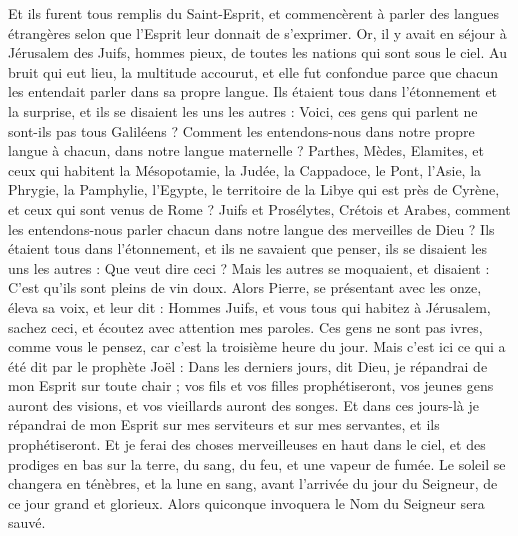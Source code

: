 \begin{multicols}{2}
Et ils furent tous remplis du Saint-Esprit, et commencèrent à parler des langues étrangères selon que l'Esprit leur donnait de s’exprimer.
Or, il y avait en séjour à Jérusalem des Juifs, hommes pieux, de toutes les nations qui sont sous le ciel.
Au bruit qui eut lieu, la multitude accourut, et elle fut confondue parce que chacun les entendait parler dans sa propre langue.
Ils étaient tous dans l’étonnement et la surprise, et ils se disaient les uns les autres : Voici, ces gens qui parlent ne sont-ils pas tous Galiléens ?
Comment les entendons-nous dans notre propre langue à chacun, dans notre langue maternelle ?
Parthes, Mèdes, Elamites, et ceux qui habitent la Mésopotamie, la Judée, la Cappadoce, le Pont, l’Asie,
la Phrygie, la Pamphylie, l’Egypte, le territoire de la Libye qui est près de Cyrène, et ceux qui sont venus de Rome ?
Juifs et Prosélytes, Crétois et Arabes, comment les entendons-nous parler chacun dans notre langue des merveilles de Dieu ?
Ils étaient tous dans l’étonnement, et ils ne savaient que penser, ils se disaient les uns les autres : Que veut dire ceci ?
Mais les autres se moquaient, et disaient : C’est qu'ils sont pleins de vin doux.
Alors Pierre, se présentant avec les onze, éleva sa voix, et leur dit : Hommes Juifs, et vous tous qui habitez à Jérusalem, sachez ceci, et écoutez avec attention mes paroles.
Ces gens ne sont pas ivres, comme vous le pensez, car c'est la troisième heure du jour.
Mais c'est ici ce qui a été dit par le prophète Joël :
Dans les derniers jours, dit Dieu, je répandrai de mon Esprit sur toute chair ; vos fils et vos filles prophétiseront, vos jeunes gens auront des visions, et vos vieillards auront des songes.
Et dans ces jours-là je répandrai de mon Esprit sur mes serviteurs et sur mes servantes, et ils prophétiseront.
Et je ferai des choses merveilleuses en haut dans le ciel, et des prodiges en bas sur la terre, du sang, du feu, et une vapeur de fumée.
Le soleil se changera en ténèbres, et la lune en sang, avant l’arrivée du jour du Seigneur, de ce jour grand et glorieux.
Alors quiconque invoquera le Nom du Seigneur sera sauvé.

\end{multicols}
